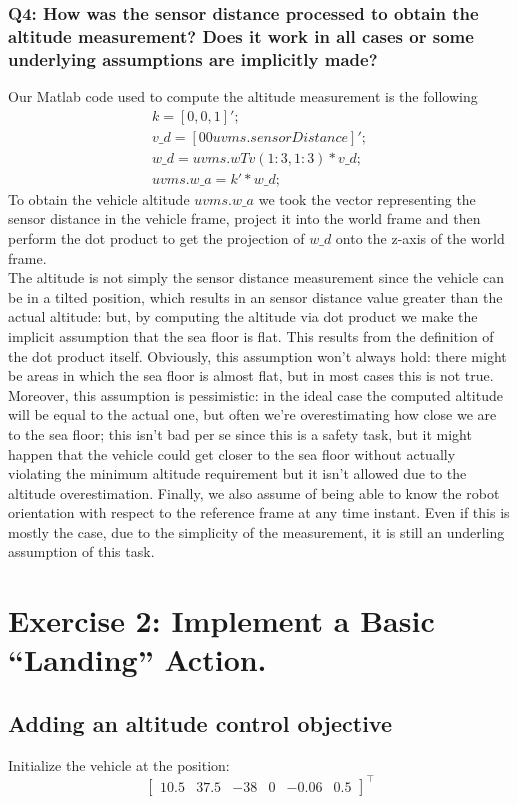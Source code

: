\documentclass{article}
\begin{document}
\subsubsection{Q4: How was the sensor distance processed to obtain the altitude measurement? Does it work in all cases or some underlying assumptions are implicitly made?}
Our Matlab code used to compute the altitude measurement is the following
\begin{gather*}
	k = [0, 0, 1]'; \\
	v\_d = [0 0 uvms.sensorDistance]'; \\
	w\_d = uvms.wTv(1:3, 1:3) * v\_d; \\
	uvms.w\_a = k' * w\_d;
\end{gather*}
To obtain the vehicle altitude $ uvms.w\_a $ we took the vector representing the sensor distance in the vehicle frame, project it into the world frame and then perform the dot product to get the projection of $ w\_d $ onto the z-axis of the world frame. \\
The altitude is not simply the sensor distance measurement since the vehicle can be in a tilted position, which results in an sensor distance value greater than the actual altitude: but, by computing the altitude via dot product we make the implicit assumption that the sea floor is flat. This results from the definition of the dot product itself. Obviously, this assumption won't always hold: there might be areas in which the sea floor is almost flat, but in most cases this is not true. \\
Moreover, this assumption is pessimistic: in the ideal case the computed altitude will be equal to the actual one, but often we're overestimating how close we are to the sea floor; this isn't bad per se since this is a safety task, but it might happen that the vehicle could get closer to the sea floor without actually violating the minimum altitude requirement but it isn't allowed due to the altitude overestimation.
Finally, we also assume of being able to know the robot orientation with respect to the reference frame at any time instant. Even if this is mostly the case, due to the simplicity of the measurement, it is still an underling assumption of this task. 

\clearpage

\section{Exercise 2: Implement a Basic “Landing” Action.}
\subsection{Adding an altitude control objective}
Initialize the vehicle at the position:
\begin{displaymath}
\begin{bmatrix} 10.5 & 37.5 & -38 & 0 & -0.06 & 0.5 \end{bmatrix}^\top
\end{displaymath}
\end{document}
